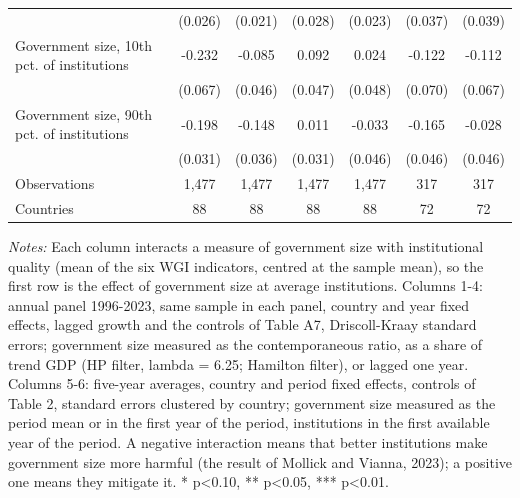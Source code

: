 \begin{table}[htbp]
\begin{tabular}{l*{6}{c}}
 & (0.026) & (0.021) & (0.028) & (0.023) & (0.037) & (0.039) \\
Government size, 10th pct. of institutions & -0.232\sym{***} & -0.085\sym{*} & 0.092\sym{*} & 0.024 & -0.122\sym{*} & -0.112\sym{*} \\
 & (0.067) & (0.046) & (0.047) & (0.048) & (0.070) & (0.067) \\
Government size, 90th pct. of institutions & -0.198\sym{***} & -0.148\sym{***} & 0.011 & -0.033 & -0.165\sym{***} & -0.028 \\
 & (0.031) & (0.036) & (0.031) & (0.046) & (0.046) & (0.046) \\
Observations & 1,477 & 1,477 & 1,477 & 1,477 & 317 & 317 \\
Countries & 88 & 88 & 88 & 88 & 72 & 72 \\
\bottomrule
\end{tabular}
\begin{minipage}{0.95\linewidth}\vspace{4pt}\scriptsize \textit{Notes:} Each column interacts a measure of government size with institutional quality (mean of the six WGI indicators, centred at the sample mean), so the first row is the effect of government size at average institutions. Columns 1-4: annual panel 1996-2023, same sample in each panel, country and year fixed effects, lagged growth and the controls of Table A7, Driscoll-Kraay standard errors; government size measured as the contemporaneous ratio, as a share of trend GDP (HP filter, lambda = 6.25; Hamilton filter), or lagged one year. Columns 5-6: five-year averages, country and period fixed effects, controls of Table 2, standard errors clustered by country; government size measured as the period mean or in the first year of the period, institutions in the first available year of the period. A negative interaction means that better institutions make government size more harmful (the result of Mollick and Vianna, 2023); a positive one means they mitigate it. * p<0.10, ** p<0.05, *** p<0.01.\end{minipage}
\end{table}
